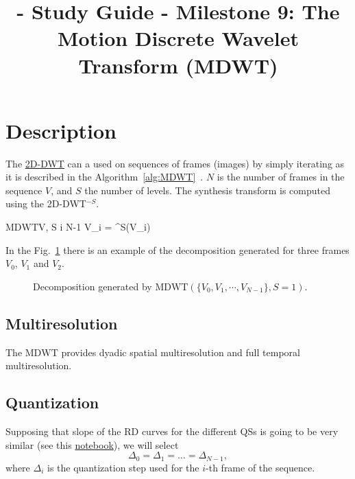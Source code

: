 
\title{\SM{} - Study Guide - Milestone 9: The Motion Discrete Wavelet Transform (MDWT)}

\maketitle

\section{Description}

The
\href{https://sistemas-multimedia.github.io/study_guide/06-2D-DWT/}{2D-DWT}
can a used on sequences of frames (images) by simply iterating as it
is described in the
Algorithm~\ref{alg:MDWT}~\cite{taubman2002jpeg2000}. $N$ is the number
of frames in the sequence $V$, and $S$ the number of levels. The
synthesis transform is computed using the 2D-DWT$^{-S}$.

\begin{pseudocode}{$\text{MDWT}$}{V, S}
  \label{alg:MDWT}
  \FOR i  \TO N-1 \DO
  V_i = ^S(V_i)
\end{pseudocode}

In the Fig.~\ref{fig:MDWT} there is an example of the decomposition
generated for three frames $V_0$, $V_1$ and $V_2$.

\begin{figure}
  \centering
  \caption{Decomposition generated by $\text{MDWT}(\{V_0, V_1, \cdots, V_{N-1}\}, S=1)$.}
  \label{fig:MDWT}
\end{figure}

\subsection{Multiresolution}
The $\text{MDWT}$ provides dyadic spatial multiresolution and full
temporal multiresolution.

\subsection{Quantization}
Supposing that slope of the RD curves for the different QSs is going
to be very similar (see this
\href{https://github.com/Sistemas-Multimedia/Sistemas-Multimedia.github.io/blob/master/study_guide/09-MDWT/performance.ipynb}{notebook}),
we will select
\begin{equation}
  \Delta_0=\Delta_1=\dots=\Delta_{N-1},
\end{equation}
where $\Delta_i$ is the quantization step used for the $i$-th frame of
the sequence.

